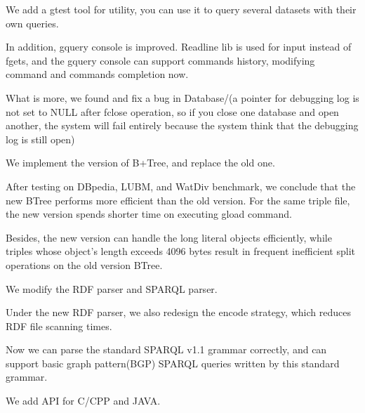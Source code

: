 \documentclass[titlepage, a4paper, 12pt]{article}
\begin{document}
We add a gtest tool for utility, you can use it to query several
datasets with their own queries.

In addition, gquery console is improved. Readline lib is used for input
instead of fgets, and the gquery console can support commands history,
modifying command and commands completion now.

What is more, we found and fix a bug in Database/(a pointer for
debugging log is not set to NULL after fclose operation, so if you close
one database and open another, the system will fail entirely because the
system think that the debugging log is still open)


We implement the version of B+Tree, and replace the old one.

After testing on DBpedia, LUBM, and WatDiv benchmark, we conclude that
the new BTree performs more efficient than the old version. For the
same triple file, the new version spends shorter time on executing gload
command.

Besides, the new version can handle the long literal objects
efficiently, while triples whose object's length exceeds 4096 bytes
result in frequent inefficient split operations on the old version
BTree.


We modify the RDF parser and SPARQL parser.

Under the new RDF parser, we also redesign the encode strategy, which
reduces RDF file scanning times.

Now we can parse the standard SPARQL v1.1 grammar correctly, and can
support basic graph pattern(BGP) SPARQL queries written by this standard
grammar.


We add API for C/CPP and JAVA.

\end{document}
